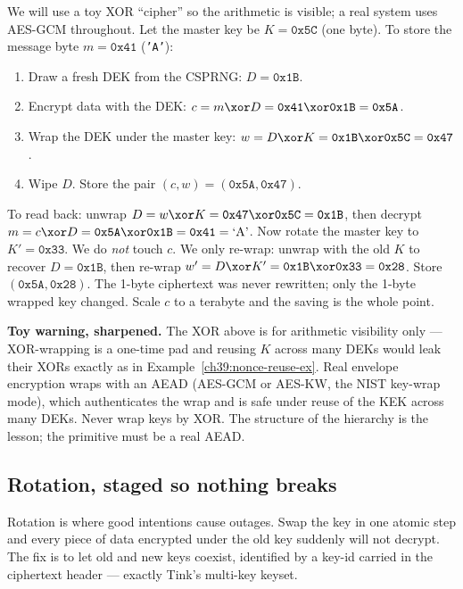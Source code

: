 \begin{example}
\label{ch39:envelope-ex}
We will use a toy XOR ``cipher'' so the arithmetic is visible; a real system uses
AES-GCM throughout. Let the master key be $K = \texttt{0x5C}$ (one byte). To store
the message byte $m = \texttt{0x41}$ (\texttt{'A'}):
\begin{enumerate}
  \item Draw a fresh DEK from the CSPRNG: $D = \texttt{0x1B}$.
  \item Encrypt data with the DEK: $c = m \xor D = \texttt{0x41} \xor \texttt{0x1B}
        = \texttt{0x5A}$.
  \item Wrap the DEK under the master key: $w = D \xor K = \texttt{0x1B} \xor
        \texttt{0x5C} = \texttt{0x47}$.
  \item Wipe $D$. Store the pair $(c, w) = (\texttt{0x5A}, \texttt{0x47})$.
\end{enumerate}
To read back: unwrap $D = w \xor K = \texttt{0x47} \xor \texttt{0x5C} =
\texttt{0x1B}$, then decrypt $m = c \xor D = \texttt{0x5A} \xor \texttt{0x1B} =
\texttt{0x41} = \text{`A'}$. Now rotate the master key to $K' = \texttt{0x33}$. We
do \emph{not} touch $c$. We only re-wrap: unwrap with the old $K$ to recover
$D = \texttt{0x1B}$, then re-wrap $w' = D \xor K' = \texttt{0x1B} \xor \texttt{0x33}
= \texttt{0x28}$. Store $(\texttt{0x5A}, \texttt{0x28})$. The 1-byte ciphertext was
never rewritten; only the 1-byte wrapped key changed. Scale $c$ to a terabyte and
the saving is the whole point.
\end{example}

\begin{focusbox}
\textbf{Toy warning, sharpened.} The XOR above is for arithmetic visibility only ---
XOR-wrapping is a one-time pad and reusing $K$ across many DEKs would leak their
XORs exactly as in Example~\ref{ch39:nonce-reuse-ex}. Real envelope encryption
wraps with an AEAD (AES-GCM or AES-KW, the NIST key-wrap mode), which authenticates
the wrap and is safe under reuse of the KEK across many DEKs. Never wrap keys by
XOR. The structure of the hierarchy is the lesson; the primitive must be a real
AEAD.
\end{focusbox}

\subsection{Rotation, staged so nothing breaks}

Rotation is where good intentions cause outages. Swap the key in one atomic step
and every piece of data encrypted under the old key suddenly will not decrypt.
The fix is to let old and new keys coexist, identified by a key-id carried in the
ciphertext header --- exactly Tink's multi-key keyset.

